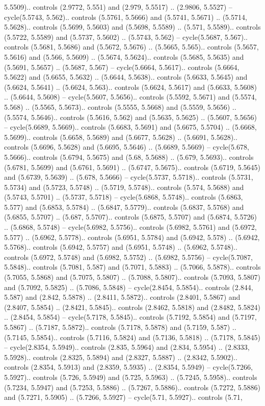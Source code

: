 5.5509).. controls (2.9772, 5.551) and (2.979, 5.5517) .. (2.9806, 5.5527) -- cycle(5.5743, 5.562).. controls (5.5761, 5.5666) and (5.5741, 5.5671) .. (5.5714, 5.5628).. controls (5.5699, 5.5603) and (5.5698, 5.5589) .. (5.571, 5.5589).. controls (5.5722, 5.5589) and (5.5737, 5.5602) .. (5.5743, 5.562) -- cycle(5.5687, 5.567).. controls (5.5681, 5.5686) and (5.5672, 5.5676) .. (5.5665, 5.565).. controls (5.5657, 5.5616) and (5.566, 5.5609) .. (5.5674, 5.5624).. controls (5.5685, 5.5635) and (5.5691, 5.5657) .. (5.5687, 5.567) -- cycle(5.6664, 5.5617).. controls (5.6664, 5.5622) and (5.6655, 5.5632) .. (5.6644, 5.5638).. controls (5.6633, 5.5645) and (5.6624, 5.5641) .. (5.6624, 5.563).. controls (5.6624, 5.5617) and (5.6633, 5.5608) .. (5.6644, 5.5608) -- cycle(5.5607, 5.5656).. controls (5.5592, 5.5671) and (5.5574, 5.568) .. (5.5565, 5.5673).. controls (5.5555, 5.5668) and (5.5559, 5.5656) .. (5.5574, 5.5646).. controls (5.5616, 5.562) and (5.5635, 5.5625) .. (5.5607, 5.5656) -- cycle(5.6689, 5.5669).. controls (5.6683, 5.5691) and (5.6675, 5.5704) .. (5.6668, 5.5699).. controls (5.6658, 5.5689) and (5.6677, 5.5628) .. (5.6691, 5.5628).. controls (5.6696, 5.5628) and (5.6695, 5.5646) .. (5.6689, 5.5669) -- cycle(5.678, 5.5666).. controls (5.6794, 5.5675) and (5.68, 5.5688) .. (5.679, 5.5693).. controls (5.6781, 5.5699) and (5.6761, 5.5691) .. (5.6747, 5.5675).. controls (5.6719, 5.5645) and (5.6739, 5.5639) .. (5.678, 5.5666) -- cycle(5.5737, 5.5718).. controls (5.5731, 5.5734) and (5.5723, 5.5748) .. (5.5719, 5.5748).. controls (5.574, 5.5688) and (5.5743, 5.5701) .. (5.5737, 5.5718) -- cycle(5.6868, 5.5748).. controls (5.6863, 5.577) and (5.6853, 5.5784) .. (5.6847, 5.5779).. controls (5.6837, 5.5768) and (5.6855, 5.5707) .. (5.687, 5.5707).. controls (5.6875, 5.5707) and (5.6874, 5.5726) .. (5.6868, 5.5748) -- cycle(5.6982, 5.5756).. controls (5.6982, 5.5761) and (5.6972, 5.577) .. (5.6962, 5.5778).. controls (5.6951, 5.5784) and (5.6942, 5.578) .. (5.6942, 5.5768).. controls (5.6942, 5.5757) and (5.6951, 5.5748) .. (5.6962, 5.5748).. controls (5.6972, 5.5748) and (5.6982, 5.5752) .. (5.6982, 5.5756) -- cycle(5.7087, 5.5848).. controls (5.7081, 5.587) and (5.7071, 5.5883) .. (5.7066, 5.5878).. controls (5.7055, 5.5868) and (5.7075, 5.5807) .. (5.7088, 5.5807).. controls (5.7093, 5.5807) and (5.7092, 5.5825) .. (5.7086, 5.5848) -- cycle(2.8454, 5.5854).. controls (2.844, 5.587) and (2.842, 5.5878) .. (2.8411, 5.5872).. controls (2.8401, 5.5867) and (2.8407, 5.5854) .. (2.8421, 5.5845).. controls (2.8462, 5.5818) and (2.8482, 5.5824) .. (2.8454, 5.5854) -- cycle(5.7178, 5.5845).. controls (5.7192, 5.5854) and (5.7197, 5.5867) .. (5.7187, 5.5872).. controls (5.7178, 5.5878) and (5.7159, 5.587) .. (5.7145, 5.5854).. controls (5.7116, 5.5824) and (5.7136, 5.5818) .. (5.7178, 5.5845) -- cycle(2.8354, 5.5949).. controls (2.835, 5.5964) and (2.834, 5.5954) .. (2.8333, 5.5928).. controls (2.8325, 5.5894) and (2.8327, 5.5887) .. (2.8342, 5.5902).. controls (2.8354, 5.5913) and (2.8359, 5.5935) .. (2.8354, 5.5949) -- cycle(5.7266, 5.5927).. controls (5.726, 5.5949) and (5.725, 5.5963) .. (5.7245, 5.5958).. controls (5.7234, 5.5947) and (5.7253, 5.5886) .. (5.7267, 5.5886).. controls (5.7272, 5.5886) and (5.7271, 5.5905) .. (5.7266, 5.5927) -- cycle(5.71, 5.5927).. controls (5.71, 